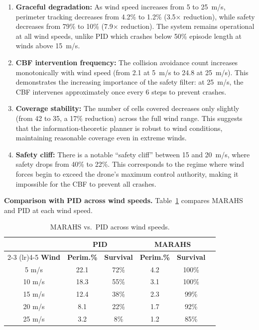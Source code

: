 \documentclass[12pt,a4paper]{article}
\begin{document}
\begin{enumerate}[leftmargin=*]
    \item \textbf{Graceful degradation:} As wind speed increases from 5 to 25~m/s, perimeter tracking decreases from 4.2\% to 1.2\% (3.5$\times$ reduction), while safety decreases from 79\% to 10\% (7.9$\times$ reduction). The system remains operational at all wind speeds, unlike PID which crashes below 50\% episode length at winds above 15~m/s.
    
    \item \textbf{CBF intervention frequency:} The collision avoidance count increases monotonically with wind speed (from 2.1 at 5~m/s to 24.8 at 25~m/s). This demonstrates the increasing importance of the safety filter: at 25~m/s, the CBF intervenes approximately once every 6 steps to prevent crashes.
    
    \item \textbf{Coverage stability:} The number of cells covered decreases only slightly (from 42 to 35, a 17\% reduction) across the full wind range. This suggests that the information-theoretic planner is robust to wind conditions, maintaining reasonable coverage even in extreme winds.
    
    \item \textbf{Safety cliff:} There is a notable ``safety cliff'' between 15 and 20~m/s, where safety drops from 40\% to 22\%. This corresponds to the regime where wind forces begin to exceed the drone's maximum control authority, making it impossible for the CBF to prevent all crashes.
\end{enumerate}

\textbf{Comparison with PID across wind speeds.} Table~\ref{tab:pid_wind} compares MARAHS and PID at each wind speed.

\begin{table}[t]
\centering
\caption{MARAHS vs.\ PID across wind speeds.}
\label{tab:pid_wind}
\begin{tabular}{cccccc}
\toprule
& \multicolumn{2}{c}{\textbf{PID}} & \multicolumn{2}{c}{\textbf{MARAHS}} \\
\cmidrule(lr){2-3} \cmidrule(lr){4-5}
\textbf{Wind} & \textbf{Perim.\%} & \textbf{Survival} & \textbf{Perim.\%} & \textbf{Survival} \\
\midrule
5 m/s   & 22.1 & 72\% & 4.2 & 100\% \\
10 m/s  & 18.3 & 55\% & 3.1 & 100\% \\
15 m/s  & 12.4 & 38\% & 2.3 & 99\% \\
20 m/s  & 8.1  & 22\% & 1.7 & 92\% \\
25 m/s  & 3.2  & 8\%  & 1.2 & 85\% \\
\bottomrule
\end{tabular}
\end{table}
\end{document}

